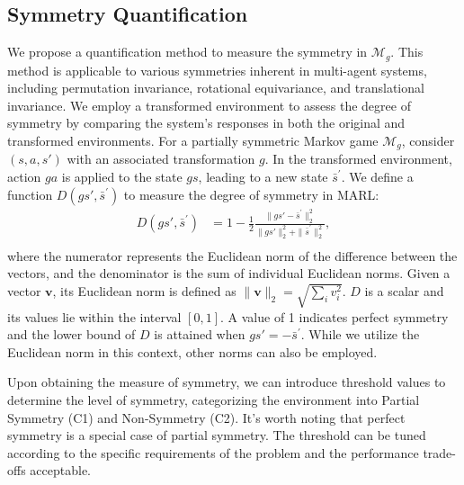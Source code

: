 \documentclass[letterpaper]{article} %
\theoremstyle{definition}
\begin{document}
\subsection{Symmetry Quantification}
We propose a quantification method to measure the symmetry in $\mathcal{M}_g$. This method is applicable to various symmetries inherent in multi-agent systems, including permutation invariance, rotational equivariance, and translational invariance. We employ a transformed environment to assess the degree of symmetry by comparing the system's responses in both the original and transformed environments. For a partially symmetric Markov game $\mathcal{M}_g$, consider $(s, a, s')$ with an associated transformation $g$. In the transformed environment, action $ga$ is applied to the state $gs$, leading to a new state $\bar{s}^{\prime}$. We define a function $ D(gs', \bar{s}^{\prime}) $ to measure the degree of symmetry in MARL:
\begin{equation}
\begin{aligned}
D(gs', \bar{s}^{\prime}) & =1- \frac{1}{2} \frac{\|gs'-\bar{s}^{\prime}\|_2^2}{\|gs'\|_2^2+\| \bar{s}^{\prime}\|_2^2}, \\
\end{aligned}\label{distance}
\end{equation}
where the numerator represents the Euclidean norm of the difference between the vectors, and the denominator is the sum of individual Euclidean norms. Given a vector $ \mathbf{v} $, its Euclidean norm is defined as $\| \mathbf{v} \|_2 = \sqrt{\sum_i v_i^2}$. $D$ is a scalar and its values lie within the interval $[0, 1]$. A value of 1 indicates perfect symmetry and the lower bound of $D$ is attained when $gs'=-\bar{s}^{\prime}$. While we utilize the Euclidean norm in this context, other norms can also be employed.

Upon obtaining the measure of symmetry, we can introduce threshold values to determine the level of symmetry, categorizing the environment into Partial Symmetry (C1) and Non-Symmetry (C2). It's worth noting that perfect symmetry is a special case of partial symmetry. The threshold can be tuned according to the specific requirements of the problem and the performance trade-offs acceptable. 
\end{document}
